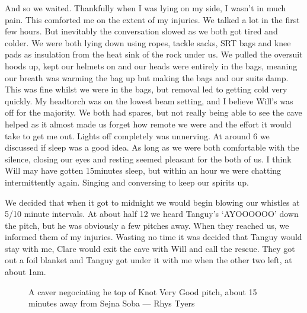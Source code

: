     And so we waited. Thankfully when I was lying on my side, I wasn’t in much pain. This comforted me on the extent of my injuries. We talked a lot in the first few hours. But inevitably the conversation slowed as we both got tired and colder. We were both lying down using ropes, tackle sacks, SRT bags and knee pads as insulation from the heat sink of the rock under us. We pulled the oversuit hoods up, kept our helmets on and our heads were entirely in the bags, meaning our breath was warming the bag up but making the bags and our suits damp. This was fine whilst we were in the bags, but removal led to getting cold very quickly. My headtorch was on the lowest beam setting, and I believe Will’s was off for the majority. We both had spares, but not really being able to see the cave helped as it almost made us forget how remote we were and the effort it would take to get me out. Lights off completely was unnerving. At around 6 we discussed if sleep was a good idea. As long as we were both comfortable with the silence, closing our eyes and resting seemed pleasant for the both of us. I think Will may have gotten 15minutes sleep, but within an hour we were chatting intermittently again. Singing and conversing to keep our spirits up.

    We decided that when it got to midnight we would begin blowing our whistles at 5/10 minute intervals. At about half 12 we heard Tanguy’s ‘AYOOOOOO’ down the pitch, but he was obviously a few pitches away. When they reached us, we informed them of my injuries. Wasting no time it was decided that Tanguy would stay with me, Clare would exit the cave with Will and call the rescue. They got out a foil blanket and Tanguy got under it with me when the other two left, at about 1am.

    \begin{figure}[t]
        \checkoddpage \ifoddpage \forcerectofloat \else \forceversofloat \fi
        \centering
        \caption{A caver negociating he top of Knot Very Good pitch, about 15 minutes away from Sejna Soba --- Rhys Tyers}
        \label{KnotVeryGood}
    \end{figure}


